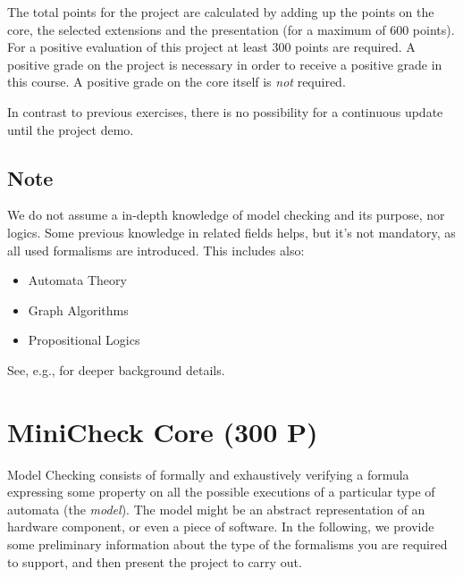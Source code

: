 \documentclass{article}
\begin{document}
The total points for the project are calculated by adding up the points on the core, 
the selected extensions and the presentation (for a maximum of 600 points).
For a positive evaluation of this project at least 300 points are required. 
A positive grade on the project is necessary in order to receive a positive grade in this course.
A positive grade on the core itself is \textit{not} required. 

In contrast to previous exercises, there is no possibility for a continuous update until the project demo.

\subsection{Note}
We do not assume a in-depth knowledge of model checking and its purpose, nor logics.
Some previous knowledge in related fields helps, but it's not mandatory,
as all used formalisms are introduced. 
This includes also:
\begin{itemize}
    \item Automata Theory
    \item Graph Algorithms
    \item Propositional Logics
\end{itemize}
See, e.g., \cite{BaKa} for deeper background details.

\section{MiniCheck Core (300 P)}

Model Checking consists of formally and exhaustively verifying a formula expressing some property
on all the possible executions of a particular type of automata (the \emph{model}). 
The model might be an abstract representation of an hardware component, or even a 
piece of software.
In the following, we provide some preliminary information 
about the type of the formalisms you are required to support, 
and then present the project to carry out. 
\end{document}
